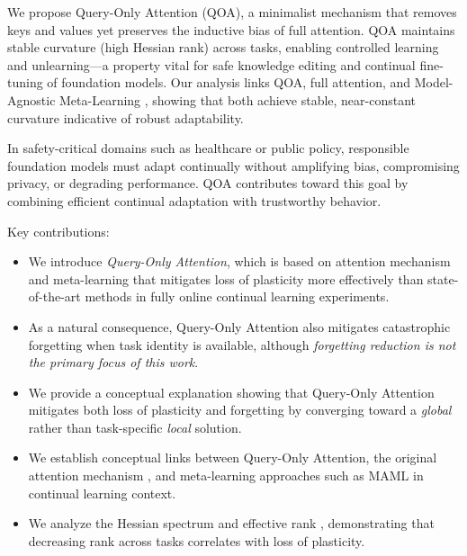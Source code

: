 \documentclass{article}
\begin{document}
We propose Query-Only Attention (QOA), a minimalist mechanism that removes keys and values yet preserves the inductive bias of full attention. QOA maintains stable curvature (high Hessian rank) across tasks, enabling controlled learning and unlearning—a property vital for safe knowledge editing and continual fine-tuning of foundation models.
Our analysis links QOA, full attention, and Model-Agnostic Meta-Learning \citep{finn2017maml}, showing that both achieve stable, near-constant curvature indicative of robust adaptability.

In safety-critical domains such as healthcare or public policy, responsible foundation models must adapt continually without amplifying bias, compromising privacy, or degrading performance. QOA contributes toward this goal by combining efficient continual adaptation with trustworthy behavior.

Key contributions:
\begin{itemize}
\item We introduce \textit{Query-Only Attention}, which is based on attention mechanism and meta-learning that mitigates loss of plasticity more effectively than state-of-the-art methods in fully online continual learning experiments.
\item As a natural consequence, Query-Only Attention also mitigates catastrophic forgetting when task identity is available, although \textit{forgetting reduction is not the primary focus of this work}.
\item We provide a conceptual explanation showing that Query-Only Attention mitigates both loss of plasticity and forgetting by converging toward a \textit{global} rather than task-specific \textit{local} solution.
\item We establish conceptual links between Query-Only Attention, the original attention mechanism \citep{vaswani2017attention}, and meta-learning approaches such as MAML \citep{finn2017maml} in continual learning context.
\item We analyze the Hessian spectrum and effective rank \citep{lewandowski2023curvature}, demonstrating that decreasing rank across tasks correlates with loss of plasticity.
\end{itemize}
\end{document}

